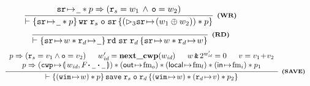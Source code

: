 \begin{figure*}[!thp]
{\begin{minipage}{1\linewidth}
			\[
				\infer[\tinybftext{(WR)}]
				{
					\wfins{\regst{\sr}{\notCare} * p}{\cwr \; \reg{s} \; \oexp \; \sr}
					{(\dlyregst{3}{\sr}{(\word_1 \xorOP \word_2)} ) * p}
				}
				{
					\regst{\sr}{\notCare} * p \Rightarrow (\reg{s} = \word_1 \, \wedge \, \oexp = \word_2)
				}
			\]
            \[
                \infer[\tinybftext{(RD)}]
                {
                    \wfins{\regst{\sr}{\word} * \regst{\reg{d}}{\notCare}}{\rd \; \sr \; \reg{d}}
                    {\regst{\sr}{\word} * \regst{\reg{d}}{\word}}
                }
                {}
            \]
%
%
			\[\begin{array}{l}
				\infer[\tinybftext{(SAVE)}]
				{
					\wfins{(\regst{\regwim}{\word}) * p}
					{\csave \; \reg{s} \; \oexp \; \reg{d}}
					{(\regst{\regwim}{\word}) *
					(\regst{\reg{d}}{\val}) * p_2}
				}
				{
					\begin{array}{c}
						p \Rightarrow (\reg{s} = \val_1 \wedge \oexp = \val_2) \quad \; \;
						\cwp' = \precwp(\cwp) \quad \; \;
						\word \,\bitAND\, 2^{\cwp'} = 0 \quad \; \;
						\val = \val_1\!+\!\val_2 \\
						p \Rightarrow
						\left(\frmst{\cwp}{\Wstack \lstApp \, \notCare \, \lstApp \, \notCare}\right) *
						(\OutRegs{\fm_o}) *
                        (\LocalRegs{\fm_l}) *
                        (\InRegs{\fm_i})
                        * p_1 \\

\end{array}}
\end{array}\]
\end{minipage}}
\end{figure*}
